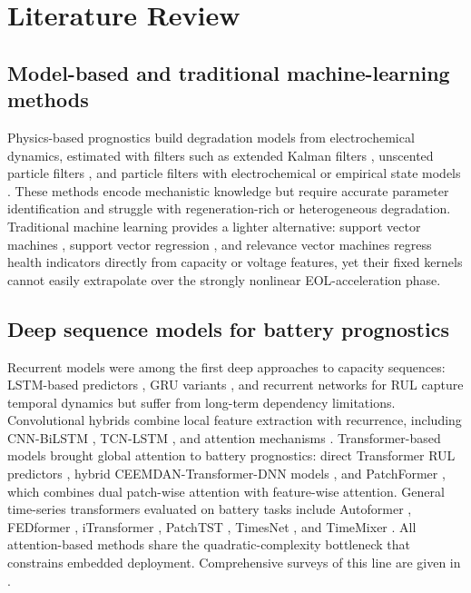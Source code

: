 \section{Literature Review}
\label{sec:related}

\subsection{Model-based and traditional machine-learning methods}

Physics-based prognostics build degradation models from electrochemical
dynamics, estimated with filters such as extended Kalman filters
\cite{ref_ekf_yan}, unscented particle filters \cite{ref_upf_cong},
and particle filters with electrochemical or empirical state models
\cite{ref_pf_echem,ref_pf_rbf,ref_pf_lui}. These methods encode
mechanistic knowledge but require accurate parameter identification
and struggle with regeneration-rich or heterogeneous degradation.
Traditional machine learning provides a lighter alternative:
support vector machines \cite{ref_svm_klass,ref_svm_patil}, support
vector regression \cite{ref_svr_wang}, and relevance vector machines
\cite{ref_rvm_guo} regress health indicators directly from capacity
or voltage features, yet their fixed kernels cannot easily extrapolate
over the strongly nonlinear EOL-acceleration phase.

\subsection{Deep sequence models for battery prognostics}

Recurrent models were among the first deep approaches to capacity sequences:
LSTM-based predictors \cite{ref_lstm_rul_zhang,ref_lstm_elman_li},
GRU variants \cite{ref_gru_ding,ref_gru_rnn}, and recurrent networks
for RUL \cite{ref_rnn_catelani} capture temporal dynamics but suffer
from long-term dependency limitations. Convolutional hybrids combine
local feature extraction with recurrence, including CNN-BiLSTM
\cite{ref_cnn_bilstm}, TCN-LSTM \cite{ref_tcn_lstm}, and attention
mechanisms \cite{ref_lstm_transformer}. Transformer-based models
\cite{ref_vaswani} brought global attention to battery prognostics:
direct Transformer RUL predictors \cite{ref_trans_rul}, hybrid
CEEMDAN-Transformer-DNN models \cite{ref_ceemdan_trans}, and
PatchFormer \cite{ref_patchformer}, which combines dual patch-wise
attention with feature-wise attention. General time-series
transformers evaluated on battery tasks include Autoformer
\cite{ref_autoformer}, FEDformer \cite{ref_fedformer}, iTransformer
\cite{ref_itransformer}, PatchTST \cite{ref_patchtst}, TimesNet
\cite{ref_timesnet}, and TimeMixer \cite{ref_timemixer}. All
attention-based methods share the quadratic-complexity bottleneck
that constrains embedded deployment. Comprehensive surveys of this
line are given in \cite{ref_lipu_review,ref_he_review}.

